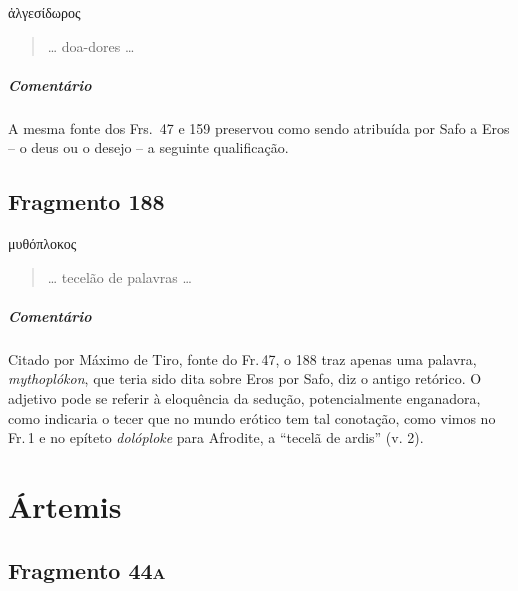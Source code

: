 \begin{gkverse}
ἀλγεσίδωρος
\end{gkverse}

\begin{verse}
\ldots{} doa-dores \ldots{} 
\end{verse}

{\paragraph{Comentário} A mesma fonte dos Frs.~47 e 159 preservou como sendo atribuída por Safo a Eros -- o deus ou o desejo -- a seguinte qualificação.}


\section{Fragmento 188}

\begin{gkverse}
μυθόπλοκος
\end{gkverse}

\begin{verse}
\ldots{} tecelão de palavras \ldots{}
\end{verse}

{\paragraph{Comentário} Citado por Máximo de Tiro, fonte do Fr.\,47, o 188 traz apenas uma palavra, \textit{mythoplókon}, que teria sido dita sobre Eros por Safo, diz o antigo retórico. O adjetivo pode se referir à eloquência da sedução, potencialmente enganadora, como indicaria o tecer que no mundo erótico tem tal conotação, como vimos no Fr.\,1 e no epíteto \textit{dolóploke} para Afrodite, a ``tecelã de ardis'' (v. 2).}


\chapter{Ártemis}

\section{Fragmento 44\textsc{a}}

